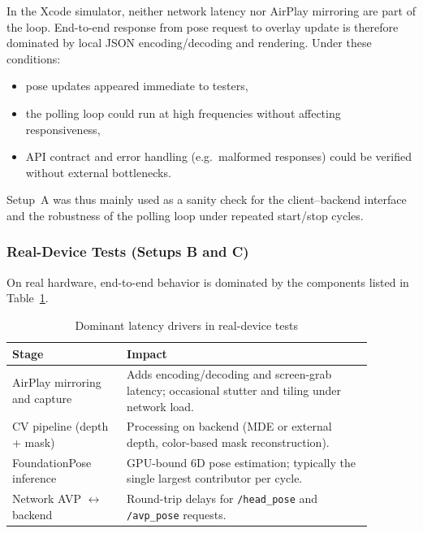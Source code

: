 In the Xcode simulator, neither network latency nor AirPlay mirroring are part of the loop. End-to-end response from pose request to overlay update is therefore dominated by local JSON encoding/decoding and rendering. Under these conditions:

\begin{itemize}
    \item pose updates appeared immediate to testers,
    \item the polling loop could run at high frequencies without affecting responsiveness,
    \item API contract and error handling (e.g.\ malformed responses) could be verified without external bottlenecks.
\end{itemize}

Setup~A was thus mainly used as a sanity check for the client–backend interface and the robustness of the polling loop under repeated start/stop cycles.

\subsubsection{Real-Device Tests (Setups B and C)}

On real hardware, end-to-end behavior is dominated by the components listed in Table~\ref{tab:latency-drivers-eval}.

\begin{table}[H]
    \centering
    \caption{Dominant latency drivers in real-device tests}
    \label{tab:latency-drivers-eval}
    \begin{tabular}{p{0.28\linewidth}p{0.60\linewidth}}
        \toprule
        \textbf{Stage} & \textbf{Impact} \\
        \midrule
        AirPlay mirroring and capture &
        Adds encoding/decoding and screen-grab latency; occasional stutter and tiling under network load. \\
        CV pipeline (depth + mask) &
        Processing on backend (MDE or external depth, color-based mask reconstruction). \\
        FoundationPose inference &
        GPU-bound 6D pose estimation; typically the single largest contributor per cycle. \\
        Network AVP \texorpdfstring{$\leftrightarrow$}{<->} backend &
        Round-trip delays for \texttt{/head\_pose} and \texttt{/avp\_pose} requests. \\
        \bottomrule
    \end{tabular}
\end{table}

